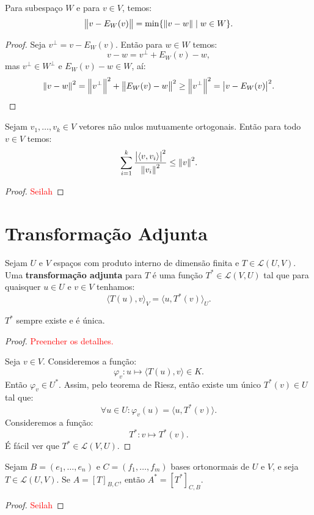 \documentclass[11pt,twoside,a4paper]{book}
\begin{document}
\begin{proposicao}
Para subespaço $W$ e para $v\in V$, temos:
\[
\norm{v-E_W(v)}=\min\{\norm{v-w}\mid w\in W\}.
\]
\end{proposicao}
\begin{proof}
Seja $v^\perp=v-E_W(v)$. Então para $w\in W$ temos:
\[
v-w=v^\perp+E_W(v)-w,
\]
mas $v^\perp\in W^\perp$ e $E_W(v)-w\in W$, aí:
\[
\norm{v-w}^2=\norm{v^\perp}^2+\norm{E_W(v)-w}^2\geq\norm{v^\perp}^2=\abs{v-E_W(v)}^2.
\]
\end{proof}

\begin{teorema}
Sejam $v_1,\dots,v_k\in V$ vetores não nulos mutuamente ortogonais. Então para todo $v\in V$ temos:
\[
\sum_{i=1}^k\frac{\abs{\langle v,v_i\rangle}^2}{\norm{v_i}^2}\leq\norm{v}^2.
\]
\end{teorema}
\begin{proof}
\textcolor{red}{Seilah}
\end{proof}

\section{Transformação Adjunta}

\begin{definicao}
Sejam $U$ e $V$ espaços com produto interno de dimensão finita e $T\in\mathcal{L}(U,V)$. Uma \textbf{transformação adjunta} para $T$ é uma função $T^*\in\mathcal{L}(V,U)$ tal que para quaisquer $u\in U$ e $v\in V$ tenhamos:
\[
\langle T(u),v\rangle_V=\langle u,T^*(v)\rangle_U.
\]
\end{definicao}

\begin{teorema}
$T^*$ sempre existe e é única.
\end{teorema}
\begin{proof}
\textcolor{red}{Preencher os detalhes.}

\medskip
\noindent
Seja $v\in V$. Consideremos a função:
\[
\varphi_v:u\mapsto\langle T(u),v\rangle\in K.
\]
Então $\varphi_v\in U^*$. Assim, pelo teorema de Riesz, então existe um único $T^*(v)\in U$ tal que:
\[
\forall u\in U:\varphi_v(u)=\langle u,T^*(v)\rangle.
\]
Consideremos a função:
\[
T^*:v\mapsto T^*(v).
\]
É fácil ver que $T^*\in\mathcal{L}(V,U)$.
\end{proof}

\begin{teorema}
Sejam $B=(e_1,\dots,e_n)$ e $C=(f_1,\dots,f_m)$ bases ortonormais de $U$ e $V$, e seja $T\in\mathcal{L}(U,V)$. Se $A=[T]_{B,C}$, então $A^*=[T^*]_{C,B}$.
\end{teorema}
\begin{proof}
\textcolor{red}{Seilah}
\end{proof}
\end{document}
